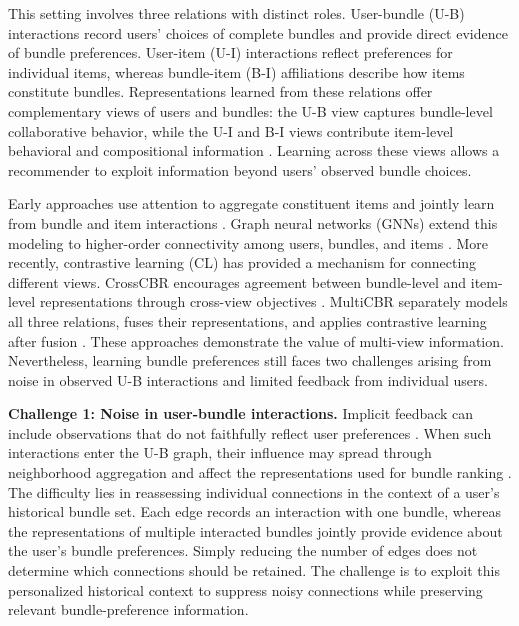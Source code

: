 \documentclass[letterpaper]{article}
\begin{document}
This setting involves three relations with distinct roles. User-bundle (U-B) interactions record users' choices of complete bundles and provide direct evidence of bundle preferences. User-item (U-I) interactions reflect preferences for individual items, whereas bundle-item (B-I) affiliations describe how items constitute bundles. Representations learned from these relations offer complementary views of users and bundles: the U-B view captures bundle-level collaborative behavior, while the U-I and B-I views contribute item-level behavioral and compositional information \cite{chen2019dam,chang2020bgcn,ma2024multicbr}. Learning across these views allows a recommender to exploit information beyond users' observed bundle choices.

Early approaches use attention to aggregate constituent items and jointly learn from bundle and item interactions \cite{chen2019dam}. Graph neural networks (GNNs) extend this modeling to higher-order connectivity among users, bundles, and items \cite{chang2020bgcn}. More recently, contrastive learning (CL) has provided a mechanism for connecting different views. CrossCBR encourages agreement between bundle-level and item-level representations through cross-view objectives \cite{ma2022crosscbr}. MultiCBR separately models all three relations, fuses their representations, and applies contrastive learning after fusion \cite{ma2024multicbr}. These approaches demonstrate the value of multi-view information. Nevertheless, learning bundle preferences still faces two challenges arising from noise in observed U-B interactions and limited feedback from individual users.

\textbf{Challenge 1: Noise in user-bundle interactions.} Implicit feedback can include observations that do not faithfully reflect user preferences \cite{wang2021adt}. When such interactions enter the U-B graph, their influence may spread through neighborhood aggregation and affect the representations used for bundle ranking \cite{wu2021sgl}. The difficulty lies in reassessing individual connections in the context of a user's historical bundle set. Each edge records an interaction with one bundle, whereas the representations of multiple interacted bundles jointly provide evidence about the user's bundle preferences. Simply reducing the number of edges does not determine which connections should be retained. The challenge is to exploit this personalized historical context to suppress noisy connections while preserving relevant bundle-preference information.
\end{document}
